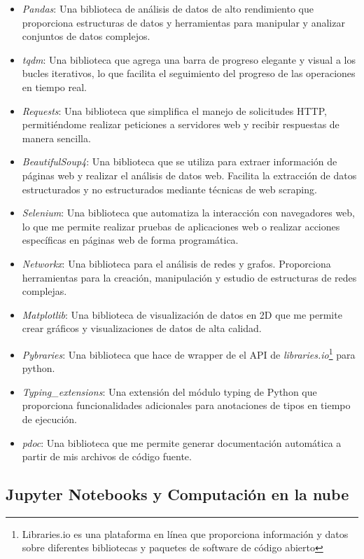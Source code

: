 \begin{itemize}
  \item \textit{Pandas}: Una biblioteca de análisis de datos de alto rendimiento que proporciona 
  estructuras de datos y herramientas para manipular y analizar conjuntos de datos complejos.
  \item \textit{tqdm}: Una biblioteca que agrega una barra de progreso elegante y visual a los 
  bucles iterativos, lo que facilita el seguimiento del progreso de las operaciones en tiempo real.
  \item \textit{Requests}: Una biblioteca que simplifica el manejo de solicitudes HTTP, 
  permitiéndome realizar peticiones a servidores web y recibir respuestas de manera sencilla.
  \item \textit{BeautifulSoup4}: Una biblioteca que se utiliza para extraer información de páginas web 
  y realizar el análisis de datos web. Facilita la extracción de datos estructurados y no estructurados 
  mediante técnicas de web scraping.
  \item \textit{Selenium}: Una biblioteca que automatiza la interacción con navegadores web, lo que 
  me permite realizar pruebas de aplicaciones web o realizar acciones específicas en páginas web de 
  forma programática.
  \item \textit{Networkx}: Una biblioteca para el análisis de redes y grafos. Proporciona herramientas 
  para la creación, manipulación y estudio de estructuras de redes complejas.
  \item \textit{Matplotlib}: Una biblioteca de visualización de datos en 2D que me permite crear 
  gráficos y visualizaciones de datos de alta calidad.
  \item \textit{Pybraries}: Una biblioteca que hace de wrapper de el API de 
  \textit{libraries.io}\footnote{Libraries.io es una plataforma en línea que proporciona información 
  y datos sobre diferentes bibliotecas y paquetes de software de código abierto} para python.
  \item \textit{Typing\_extensions}: Una extensión del módulo typing de Python que proporciona 
  funcionalidades adicionales para anotaciones de tipos en tiempo de ejecución.
  \item \textit{pdoc}: Una biblioteca que me permite generar documentación automática a partir 
  de mis archivos de código fuente.
\end{itemize}

\subsection{Jupyter Notebooks y Computación en la nube}

